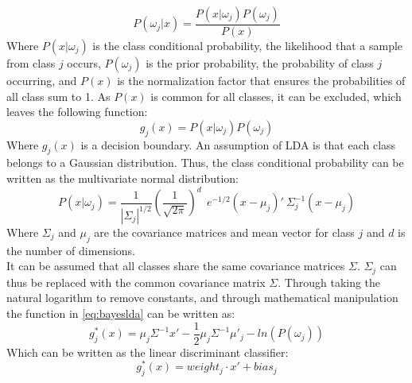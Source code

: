 \begin{equation}
	P(\omega_{j}|x) = \frac{P(x|\omega_{j})P(\omega_{j})}{P(x)}
\end{equation}
\vspace{-0.02cm}
\noindent Where $P(x|\omega_{j})$ is the class conditional probability, the likelihood that a sample from class $j$ occurs, $P(\omega_{j})$ is the prior probability, the probability of class $j$ occurring, and $P(x)$ is the normalization factor that ensures the probabilities of all class sum to 1. As $P(x)$ is common for all classes, it can be excluded, which leaves the following function:
\vspace{-0.05cm}
\begin{equation} \label{eq:bayeslda}
	g_{j}(x) = P(x|\omega_{j})P(\omega_{j})
\end{equation} 
\vspace{-0.02cm}
\noindent Where $g_{j}(x)$ is a decision boundary. An assumption of LDA is that each class belongs to a Gaussian distribution. Thus, the class conditional probability can be written as the multivariate normal distribution:
\vspace{-0.05cm}
\begin{equation}
P(x|\omega_{j}) = \frac{1}{|\varSigma_{j}|^{1/2}}(\frac{1}{\sqrt{2\pi}})^{d} ~~e^{-1/2} (x-\mu_{j})' ~\varSigma^{-1}_{j} (x-\mu_{j})
\end{equation} 
\vspace{-0.05cm}
\noindent Where $\varSigma_{j}$ and $\mu_{j}$ are the covariance matrices and mean vector for class $j$ and $d$ is the number of dimensions. \\
It can be assumed that all classes share the same covariance matrices $\varSigma$. $\varSigma_{j}$ can thus be replaced with the common covariance matrix $\varSigma$. Through taking the natural logarithm to remove constants, and through mathematical manipulation the function in \eqref{eq:bayeslda} can be written as:
\vspace{-0.05cm}
\begin{equation} 
	g_{j}^{*}(x) = \mu_{j}\varSigma^{-1}x' - \frac{1}{2}\mu_{j}\varSigma^{-1}\mu'_{j} - ln(P(\omega_{j}))
\end{equation}
\noindent Which can be written as the linear discriminant classifier:
\begin{equation} \label{eq:ldclassifier}
	g_{j}^{*}(x) = weight_{j}\cdot x' + bias_{j}
\end{equation}
